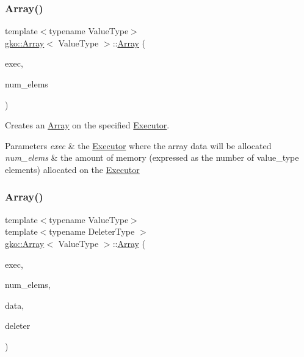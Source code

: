\subsubsection{\texorpdfstring{Array()}{Array()}\hspace{0.1cm}{\footnotesize\ttfamily [3/11]}}
{\footnotesize\ttfamily template$<$typename Value\+Type$>$ \\
\hyperlink{classgko_1_1Array}{gko\+::\+Array}$<$ Value\+Type $>$\+::\hyperlink{classgko_1_1Array}{Array} (\begin{DoxyParamCaption}\item[{std\+::shared\+\_\+ptr$<$ const \hyperlink{classgko_1_1Executor}{Executor} $>$}]{exec,  }\item[{\hyperlink{namespacegko_a6e5c95df0ae4e47aab2f604a22d98ee7}{size\+\_\+type}}]{num\+\_\+elems }\end{DoxyParamCaption})}



Creates an \hyperlink{classgko_1_1Array}{Array} on the specified \hyperlink{classgko_1_1Executor}{Executor}. 


\begin{DoxyParams}{Parameters}
{\em exec} & the \hyperlink{classgko_1_1Executor}{Executor} where the array data will be allocated \\
\hline
{\em num\+\_\+elems} & the amount of memory (expressed as the number of {\ttfamily value\+\_\+type} elements) allocated on the \hyperlink{classgko_1_1Executor}{Executor} \\
\hline
\end{DoxyParams}
\mbox{\label{classgko_1_1Array_a4aa436a039fe6a6391b810a44d0ca9c7}} 
\subsubsection{\texorpdfstring{Array()}{Array()}\hspace{0.1cm}{\footnotesize\ttfamily [4/11]}}
{\footnotesize\ttfamily template$<$typename Value\+Type$>$ \\
template$<$typename Deleter\+Type $>$ \\
\hyperlink{classgko_1_1Array}{gko\+::\+Array}$<$ Value\+Type $>$\+::\hyperlink{classgko_1_1Array}{Array} (\begin{DoxyParamCaption}\item[{std\+::shared\+\_\+ptr$<$ const \hyperlink{classgko_1_1Executor}{Executor} $>$}]{exec,  }\item[{\hyperlink{namespacegko_a6e5c95df0ae4e47aab2f604a22d98ee7}{size\+\_\+type}}]{num\+\_\+elems,  }\item[{\hyperlink{classgko_1_1Array_ad40c95e429262175cae51bcabd291a5b}{value\+\_\+type} $\ast$}]{data,  }\item[{Deleter\+Type}]{deleter }\end{DoxyParamCaption})}



